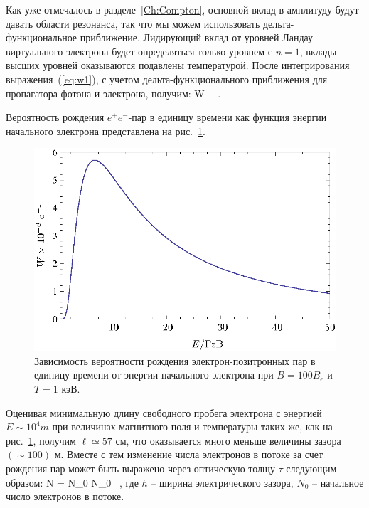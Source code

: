 Как уже отмечалось в разделе~\ref{Ch:Compton}, основной вклад в амплитуду будут 
давать области резонанса, так что 
мы можем использовать дельта-функциональное приближение. Лидирующий вклад от 
уровней Ландау виртуального электрона будет определяться только уровнем с 
$n=1$, вклады высших уровней оказываются подавлены температурой. 
После интегрирования  выражения~(\ref{eq:w1}), с учетом дельта-функционального 
приближения для пропагатора фотона и электрона, получим:
%
\beq
\label{eq:Wfin}
W \simeq  {} \, 
 \, .
\eeq


Вероятность рождения $e^+e^-$-пар в единицу времени как функция 
энергии начального  электрона 
представлена на рис.~\ref{fig:prob}. 


%
\begin{figure}[h]
\centerline{\includegraphics[width=14cm]{fig5_5.eps}}
\caption{Зависимость вероятности рождения электрон-позитронных пар в единицу времени от энергии 
начального электрона  при $B=100B_e$ и $T=1$ кэВ.}
\label{fig:prob}
\end{figure}

Оценивая минимальную длину свободного пробега электрона 
с энергией $E \sim 10^{4} m$ при величинах  
магнитного поля и температуры таких же, как на рис.~\ref{fig:prob}, получим 
$\ell \simeq 57$ см, что 
оказывается много меньше величины зазора $(\sim 100)$ м.  
Вместе с тем изменение числа электронов в потоке за счет рождения пар может быть 
выражено через оптическую толщу $\tau$ следующим образом: 
%
\beq
\label{eq:tau}
N = N_0 \exp{[-\tau]} \simeq N_0  \, , 
\eeq
\noindent где  $h$ -- ширина электрического зазора, 
$N_0$ -- начальное число электронов в потоке.

